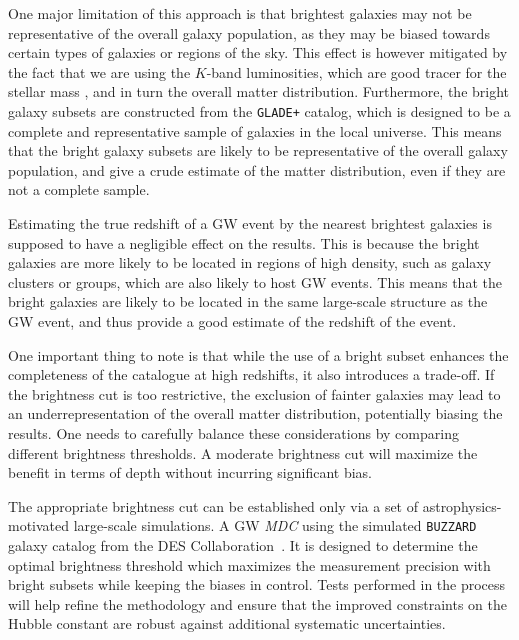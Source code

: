 One major limitation of this approach is that brightest galaxies may not be representative of the overall galaxy population, as they may be biased towards certain types of galaxies or regions of the sky. This effect is however mitigated by the fact that we are using the $K$-band luminosities, which are good tracer for the stellar mass \citep{strazzullo2006near,sureshkumar2021galaxy}, and in turn the overall matter distribution. Furthermore, the bright galaxy subsets are constructed from the \texttt{GLADE+} catalog, which is designed to be a complete and representative sample of galaxies in the local universe. This means that the bright galaxy subsets are likely to be representative of the overall galaxy population, and give a crude estimate of the matter distribution, even if they are not a complete sample.

Estimating the true redshift of a \ac{GW} event by the nearest brightest galaxies is supposed to have a negligible effect on the results. This is because the bright galaxies are more likely to be located in regions of high density, such as galaxy clusters or groups, which are also likely to host \ac{GW} events. This means that the bright galaxies are likely to be located in the same large-scale structure as the \ac{GW} event, and thus provide a good estimate of the redshift of the event. 

One important thing to note is that while the use of a bright subset enhances the completeness of the catalogue at high redshifts, it also introduces a trade-off. If the brightness cut is too restrictive, the exclusion of fainter galaxies may lead to an underrepresentation of the overall matter distribution, potentially biasing the results. One needs to carefully balance these considerations by comparing different brightness thresholds. A moderate brightness cut will maximize the benefit in terms of depth without incurring significant bias.

The appropriate brightness cut can be established only via a set of astrophysics-motivated large-scale simulations. A \ac{GW} \textit{\ac{MDC}} using the simulated \texttt{\texttt{BUZZARD}} galaxy catalog from the \ac{DES} Collaboration~\citep{DES:2019jmj,DES:2021bwg}. It is designed to determine the optimal brightness threshold which maximizes the measurement precision with bright subsets while keeping the biases in control. Tests performed in the process will help refine the methodology and ensure that the improved constraints on the Hubble constant are robust against additional systematic uncertainties.

